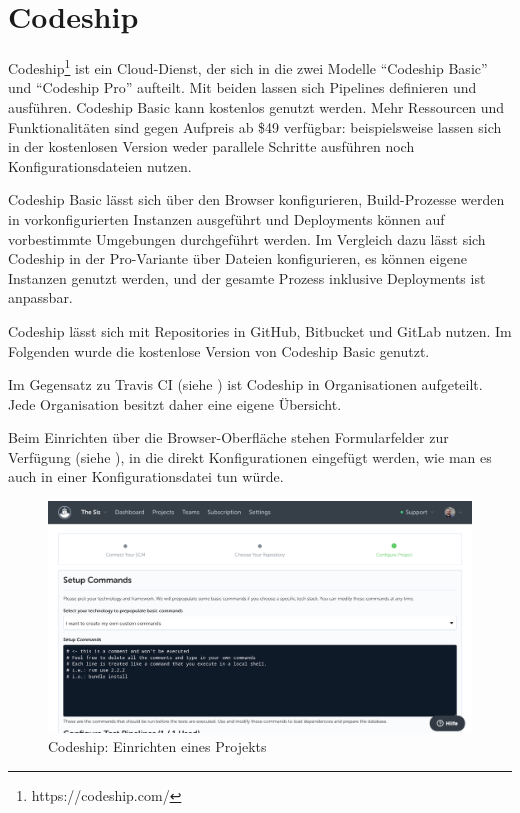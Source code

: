 \section{Codeship}
\label{sec:analyse-codeship}

Codeship\footnote{https://codeship.com/} ist ein Cloud-Dienst, der sich in die zwei Modelle ``Codeship Basic'' und ``Codeship Pro'' aufteilt. Mit beiden lassen sich Pipelines definieren und ausführen. Codeship Basic kann kostenlos genutzt werden. Mehr Ressourcen und Funktionalitäten sind gegen Aufpreis ab \$49 verfügbar: beispielsweise lassen sich in der kostenlosen Version weder parallele Schritte ausführen noch Konfigurationsdateien nutzen.

Codeship Basic lässt sich über den Browser konfigurieren, Build-Prozesse werden in vorkonfigurierten Instanzen ausgeführt und Deployments können auf vorbestimmte Umgebungen durchgeführt werden. Im Vergleich dazu lässt sich Codeship in der Pro-Variante über Dateien konfigurieren, es können eigene Instanzen genutzt werden, und der gesamte Prozess inklusive Deployments ist anpassbar.

Codeship lässt sich mit Repositories in GitHub, Bitbucket und GitLab nutzen. Im Folgenden wurde die kostenlose Version von Codeship Basic genutzt.

Im Gegensatz zu Travis CI (siehe ) ist Codeship in Organisationen aufgeteilt. Jede Organisation besitzt daher eine eigene Übersicht.

Beim Einrichten über die Browser-Oberfläche stehen Formularfelder zur Verfügung (siehe ), in die direkt Konfigurationen eingefügt werden, wie man es auch in einer Konfigurationsdatei tun würde.

\begin{figure}[h]
  \caption{Codeship: Einrichten eines Projekts}
  \label{fig:codeship-setup}
  \includegraphics[width=.8\textwidth]{assets/codeship-setup}
\end{figure}

